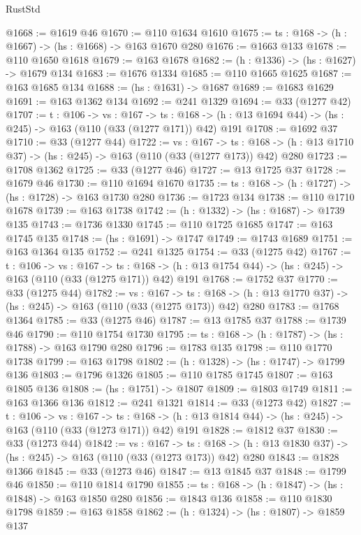 \begin{lexlean}{RustStd}
\begin{coremodule}
@1668 := @1619 @46
@1670 := @110 @1634 @1610
@1675 := {ts : @168} -> (h : @1667) -> (hs : @1668) -> @163 @1670 @280
@1676 := @1663 @133
@1678 := @110 @1650 @1618
@1679 := @163 @1678
@1682 := (h : @1336) -> (hs : @1627) -> @1679 @134
@1683 := @1676 @1334
@1685 := @110 @1665 @1625
@1687 := @163 @1685 @134
@1688 := (hs : @1631) -> @1687
@1689 := @1683 @1629
@1691 := @163 @1362 @134
@1692 := @241 @1329
@1694 := @33 (@1277 @42)
@1707 := {t : @106} ->
  {vs : @167} ->
  {ts : @168} -> (h : @13 @1694 @44) -> (hs : @245) -> @163 (@110 (@33 (@1277 @171)) @42) @191
@1708 := @1692 @37
@1710 := @33 (@1277 @44)
@1722 := {vs : @167} ->
  {ts : @168} -> (h : @13 @1710 @37) -> (hs : @245) -> @163 (@110 (@33 (@1277 @173)) @42) @280
@1723 := @1708 @1362
@1725 := @33 (@1277 @46)
@1727 := @13 @1725 @37
@1728 := @1679 @46
@1730 := @110 @1694 @1670
@1735 := {ts : @168} -> (h : @1727) -> (hs : @1728) -> @163 @1730 @280
@1736 := @1723 @134
@1738 := @110 @1710 @1678
@1739 := @163 @1738
@1742 := (h : @1332) -> (hs : @1687) -> @1739 @135
@1743 := @1736 @1330
@1745 := @110 @1725 @1685
@1747 := @163 @1745 @135
@1748 := (hs : @1691) -> @1747
@1749 := @1743 @1689
@1751 := @163 @1364 @135
@1752 := @241 @1325
@1754 := @33 (@1275 @42)
@1767 := {t : @106} ->
  {vs : @167} ->
  {ts : @168} -> (h : @13 @1754 @44) -> (hs : @245) -> @163 (@110 (@33 (@1275 @171)) @42) @191
@1768 := @1752 @37
@1770 := @33 (@1275 @44)
@1782 := {vs : @167} ->
  {ts : @168} -> (h : @13 @1770 @37) -> (hs : @245) -> @163 (@110 (@33 (@1275 @173)) @42) @280
@1783 := @1768 @1364
@1785 := @33 (@1275 @46)
@1787 := @13 @1785 @37
@1788 := @1739 @46
@1790 := @110 @1754 @1730
@1795 := {ts : @168} -> (h : @1787) -> (hs : @1788) -> @163 @1790 @280
@1796 := @1783 @135
@1798 := @110 @1770 @1738
@1799 := @163 @1798
@1802 := (h : @1328) -> (hs : @1747) -> @1799 @136
@1803 := @1796 @1326
@1805 := @110 @1785 @1745
@1807 := @163 @1805 @136
@1808 := (hs : @1751) -> @1807
@1809 := @1803 @1749
@1811 := @163 @1366 @136
@1812 := @241 @1321
@1814 := @33 (@1273 @42)
@1827 := {t : @106} ->
  {vs : @167} ->
  {ts : @168} -> (h : @13 @1814 @44) -> (hs : @245) -> @163 (@110 (@33 (@1273 @171)) @42) @191
@1828 := @1812 @37
@1830 := @33 (@1273 @44)
@1842 := {vs : @167} ->
  {ts : @168} -> (h : @13 @1830 @37) -> (hs : @245) -> @163 (@110 (@33 (@1273 @173)) @42) @280
@1843 := @1828 @1366
@1845 := @33 (@1273 @46)
@1847 := @13 @1845 @37
@1848 := @1799 @46
@1850 := @110 @1814 @1790
@1855 := {ts : @168} -> (h : @1847) -> (hs : @1848) -> @163 @1850 @280
@1856 := @1843 @136
@1858 := @110 @1830 @1798
@1859 := @163 @1858
@1862 := (h : @1324) -> (hs : @1807) -> @1859 @137

\end{coremodule}
\end{lexlean}
